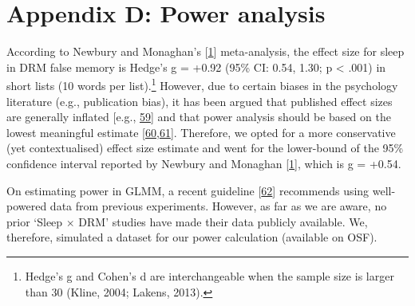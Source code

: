 \documentclass[
]{article}
\begin{document}
\hypertarget{appendix-d-power-analysis}{%
\section*{Appendix D: Power analysis}\label{appendix-d-power-analysis}}

\setcounter{table}{0} \renewcommand{\thetable}{D\arabic{table}} \setcounter{figure}{0} \renewcommand{\thefigure}{D\arabic{figure}}

According to Newbury and Monaghan's {[}\protect\hyperlink{ref-newbury2019a}{1}{]} meta-analysis, the effect size for sleep in DRM false memory is Hedge's g = +0.92 (95\% CI: 0.54, 1.30; p \textless{} .001) in short lists (10 words per list).\footnote{Hedge’s g and Cohen’s d are interchangeable when the sample size is larger than 30 (Kline, 2004; Lakens, 2013).} However, due to certain biases in the psychology literature (e.g., publication bias), it has been argued that published effect sizes are generally inflated {[}e.g., \protect\hyperlink{ref-schaefer2019a}{59}{]} and that power analysis should be based on the lowest meaningful estimate {[}\protect\hyperlink{ref-albers2018a}{60},\protect\hyperlink{ref-cortex2013a}{61}{]}. Therefore, we opted for a more conservative (yet contextualised) effect size estimate and went for the lower-bound of the 95\% confidence interval reported by Newbury and Monaghan {[}\protect\hyperlink{ref-newbury2019a}{1}{]}, which is g = +0.54.

On estimating power in GLMM, a recent guideline {[}\protect\hyperlink{ref-kumle2021a}{62}{]} recommends using well-powered data from previous experiments. However, as far as we are aware, no prior `Sleep \(\times\) DRM' studies have made their data publicly available. We, therefore, simulated a dataset for our power calculation (available on OSF).
\end{document}

